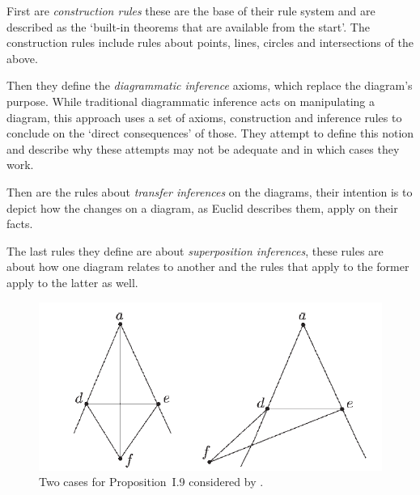 \documentclass[]{interact}
\theoremstyle{plain}
\theoremstyle{definition}
\theoremstyle{remark}
\newcommand{\term}[1]{\emph{#1\/}}
\newcommand{\quotes}[1]{`#1'}
\begin{document}
First are \term{construction rules} these are the base of their rule
system and are described as the
\quotes{built-in theorems that are available from the start}.
The construction rules include rules about points, lines, circles and
intersections of the above.

Then they define the \term{diagrammatic inference} axioms, which
replace the diagram's purpose. While traditional diagrammatic 
inference acts on manipulating a diagram, this approach uses a set of 
axioms, construction and inference rules to conclude on the \quotes{direct 
consequences} of those. They attempt to define this notion and 
describe why these attempts may not be adequate and in which cases 
they work. 

Then are the rules about \term{transfer inferences} on the diagrams,
their intention is to depict how the changes on a diagram, as Euclid
describes them, apply on their facts.

The last rules they define are about \term{superposition inferences},
these rules are about how one diagram relates to another and the rules
that apply to the former apply to the latter as well.


\begin{figure}[t]
  \centering
  \includegraphics[scale=0.5]{avigad-fig8-I9}
  \caption[Avigad et al Approach I.9]{Two cases for Proposition~I.9
    considered by \citet{avigad-etal:2009}.}
  \label{fig:avigadi9}
\end{figure}
\end{document}
